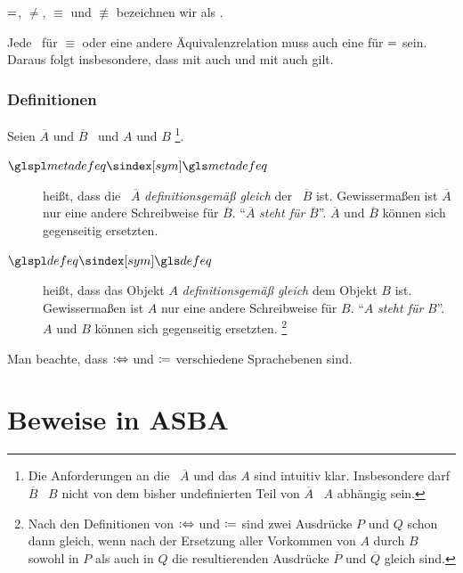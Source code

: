 $=$, $\ne$, $\equiv$ und $\nequiv$ bezeichnen wir als  .

Jede \interessierendeEigenschaft\ für $\equiv$ oder eine andere Äquivalenzrelation muss auch eine für $=$ sein.
Daraus folgt insbesondere, dass mit  auch  und mit  auch  gilt.

\subsubsection{Definitionen}%
\label{subsub:Definitionen}

{
	\newcommand*{\A}{\overline{A}}
	\newcommand*{\B}{\overline{B}}
	Seien $\A$ und $\B$ \Aussagen\ und $A$ und $B$ %
	\footnote{%
		Die Anforderungen an die \Aussage\ $\A$ und das  $A$ sind intuitiv klar.
		Insbesondere darf $\B$ \textbzw\ $B$ nicht von dem bisher undefinierten Teil von $\A$ \textbzw\ $A$ abhängig sein.
	}.
	\begin{description}
		\item[$\glsSym{metadefeq}$~\emph{}]\label{def:Metadefinition}
		\seqqt{$\A \metadefeq \B$} heißt, dass die \Aussage\ $\A$ \emph{definitionsgemäß gleich} der \Aussage\ $\B$ ist.
		Gewissermaßen ist $\A$ nur eine andere Schreibweise für $\B$.
		\enquote{$\A$ \emph{steht für} $\B$}.
		$\A$ und $\B$ können sich gegenseitig ersetzten.
		\item[$\glsSym{defeq}$~\emph{}]\label{def:Definition}
		 heißt, dass das Objekt $A$ \emph{definitionsgemäß gleich} dem Objekt $B$ ist.
		Gewissermaßen ist $A$ nur eine andere Schreibweise für $B$.
		\enquote{$A$ \emph{steht für} $B$}.
		$A$ und $B$ können sich gegenseitig ersetzten.%
		\footnote{%
			Nach den Definitionen von $:\Leftrightarrow$ und $\coloneqq$ sind zwei Ausdrücke $P$ und $Q$ schon dann gleich, wenn nach der Ersetzung aller Vorkommen von $A$ durch $B$ sowohl in $P$ als auch in $Q$ die resultierenden Ausdrücke $\overline{P}$ und $\overline{Q}$ gleich sind.
		}

	\end{description}
	Man beachte, dass $:\Leftrightarrow$ und $\coloneqq$ verschiedene Sprachebenen sind.
}

\section{Beweise in ASBA}%
\label{sec:BeweiseASBA}

